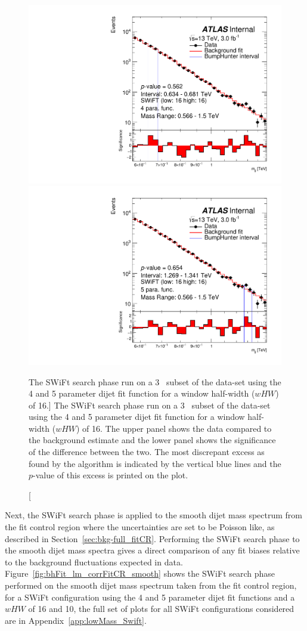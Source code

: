 \begin{figure}[!htb]
  \vspace{-1.5mm}
\captionsetup[subfigure]{aboveskip=0pt,justification=centering}
\centering
{} {
  \includegraphics[width=0.42\linewidth, angle=0]{figs/Dibjet/LowMass/FitStudy_min566/bhFit_subset_4para_low16_high16.pdf}
}
 {
  \includegraphics[width=0.42\linewidth, angle=0]{figs/Dibjet/LowMass/FitStudy_min566/bhFit_subset_5para_low16_high16.pdf}
}
\caption
    [The SWiFt search phase run on a 3~\ifb{} subset of the \lm{} data-set using
      the 4 and 5 parameter dijet fit function for a window half-width ($wHW$) of 16.]
    {\label{fig:bhFit_lm_subset}
      The SWiFt search phase run on a 3~\ifb{} subset of the \lm{} data-set using the 4 and 5 parameter dijet fit function for a window half-width ($wHW$) of 16.
      The upper panel shows the data compared to the background estimate and the lower panel shows the significance of the difference between the two.
      The most discrepant excess as found by the \bh{} algorithm is indicated by the vertical blue lines and the \mbox{$p$-value} of this excess is printed on the plot. }
\end{figure}

Next, the SWiFt search phase is applied to the smooth dijet mass spectrum from the fit control region
where the uncertainties are set to be Poisson like,
as described in Section~\ref{sec:bkg-full_fitCR}.
Performing the SWiFt search phase to the smooth dijet mass spectra gives a direct comparison
of any fit biases relative to the background fluctuations expected in data.
Figure~\ref{fig:bhFit_lm_corrFitCR_smooth} shows the SWiFt search phase
performed on the smooth dijet mass spectrum taken from the fit control region,
for a SWiFt configuration using the 4 and 5 parameter dijet fit functions and a $wHW$ of 16 and 10,
the full set of plots for all SWiFt configurations considered are in Appendix~\ref{app:lowMass_Swift}.

